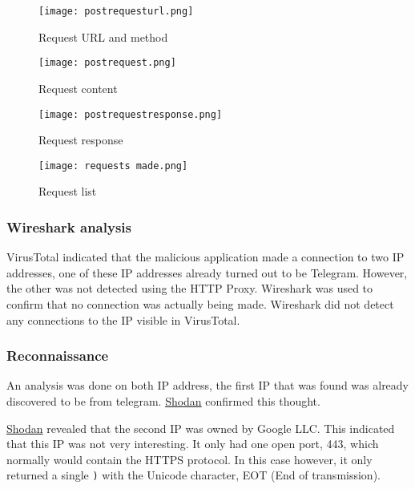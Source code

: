 \begin{figure}[H]
    \texttt{[image: postrequesturl.png]}
    \caption{Request URL and method}
    \label{rafael-requesturl}
\end{figure}
\begin{figure}[H]
    \texttt{[image: postrequest.png]}
    \caption{Request content}
    \label{rafael-requestcontent}
\end{figure}
\begin{figure}[H]
    \texttt{[image: postrequestresponse.png]}
    \caption{Request response}
    \label{rafael-requestresponse}
\end{figure}
\begin{figure}[H]
    \texttt{[image: requests made.png]}
    \caption{Request list}
    \label{rafael-requestlist}
\end{figure}

\subsubsection{Wireshark analysis}

VirusTotal indicated that the malicious application made a connection to two IP addresses, one of these IP addresses already turned out to be Telegram.
However, the other was not detected using the HTTP Proxy.
Wireshark was used to confirm that no connection was actually being made. Wireshark did not detect any connections to the IP visible in VirusTotal.

\subsubsection{Reconnaissance}

An analysis was done on both IP address, the first IP that was found was already discovered to be from telegram.
\href{https://www.shodan.io/host/149.154.167.220}{Shodan} confirmed this thought.

\href{https://www.shodan.io/host/142.250.31.188}{Shodan} revealed that the second IP was owned by Google LLC. This indicated that this IP was not very interesting.
It only had one open port, 443, which normally would contain the HTTPS protocol.
In this case however, it only returned a single \texttt{)} with the Unicode character, EOT (End of transmission).